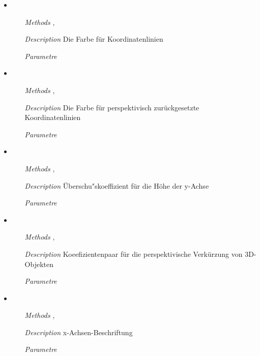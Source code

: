\begin{itemize}
\item {}
\begin{enumerate}
\item[\textit{Methods}] , 
\item[\textit{Description}] Die Farbe f\"ur Koordinatenlinien
\item[\textit{Parametre}] 
\end{enumerate}

\item {}
\begin{enumerate}
\item[\textit{Methods}] , 
\item[\textit{Description}] Die Farbe f\"ur perspektivisch
  zur\"uckgesetzte Koordinatenlinien
\item[\textit{Parametre}] 
\end{enumerate}

\item {}
\begin{enumerate}
\item[\textit{Methods}] ,
\item[\textit{Description}] \"Uberschu"skoeffizient f\"ur die H\"ohe
  der y-Achse
\item[\textit{Parametre}] 
\end{enumerate}

\item {}
\begin{enumerate}
\item[\textit{Methods}] ,
\item[\textit{Description}] Koeefizientenpaar f\"ur die
  perspektivische Verk\"urzung von 3D-Objekten
\item[\textit{Parametre}] 
\end{enumerate}

\item {}
\begin{enumerate}
\item[\textit{Methods}] ,
\item[\textit{Description}] x-Achsen-Beschriftung
\item[\textit{Parametre}] 
\end{enumerate}


\end{itemize}
